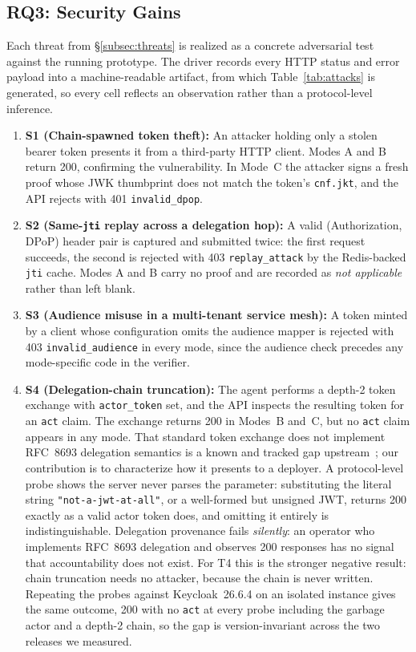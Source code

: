 \documentclass[conference]{IEEEtran}
\begin{document}
\subsection{RQ3: Security Gains}
\label{subsec:rq3}

Each threat from \S\ref{subsec:threats} is realized as a concrete adversarial test against the running prototype. The driver records every HTTP status and error payload into a machine-readable artifact, from which Table~\ref{tab:attacks} is generated, so every cell reflects an observation rather than a protocol-level inference.

\begin{enumerate}

\item \textbf{S1 (Chain-spawned token theft):} An attacker holding only a stolen bearer token presents it from a third-party HTTP client. Modes A and B return 200, confirming the vulnerability. In Mode~C the attacker signs a fresh proof whose JWK thumbprint does not match the token's \texttt{cnf.jkt}, and the API rejects with 401 \texttt{invalid\_dpop}.

\item \textbf{S2 (Same-\texttt{jti} replay across a delegation hop):} A valid (Authorization, DPoP) header pair is captured and submitted twice: the first request succeeds, the second is rejected with 403 \texttt{replay\_attack} by the Redis-backed \texttt{jti} cache. Modes A and B carry no proof and are recorded as \emph{not applicable} rather than left blank.

\item \textbf{S3 (Audience misuse in a multi-tenant service mesh):} A token minted by a client whose configuration omits the audience mapper is rejected with 403 \texttt{invalid\_audience} in every mode, since the audience check precedes any mode-specific code in the verifier.

\item \textbf{S4 (Delegation-chain truncation):} The agent performs a depth-2 token exchange with \texttt{actor\_token} set, and the API inspects the resulting token for an \texttt{act} claim. The exchange returns 200 in Modes~B and~C, but no \texttt{act} claim appears in any mode. That standard token exchange does not implement RFC~8693 delegation semantics is a known and tracked gap upstream~\cite{keycloak_issue_12076,keycloak_issue_38279}; our contribution is to characterize how it presents to a deployer. A protocol-level probe shows the server never parses the parameter: substituting the literal string \texttt{"not-a-jwt-at-all"}, or a well-formed but unsigned JWT, returns 200 exactly as a valid actor token does, and omitting it entirely is indistinguishable. Delegation provenance fails \emph{silently}: an operator who implements RFC~8693 delegation and observes 200 responses has no signal that accountability does not exist. For T4 this is the stronger negative result: chain truncation needs no attacker, because the chain is never written. Repeating the probes against Keycloak~26.6.4 on an isolated instance gives the same outcome, 200 with no \texttt{act} at every probe including the garbage actor and a depth-2 chain, so the gap is version-invariant across the two releases we measured.


\end{enumerate}
\end{document}
